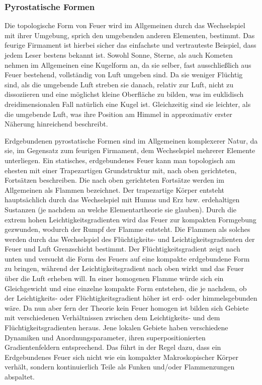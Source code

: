 \documentclass[a5paper,8pt]{book}
\begin{document}
\subsubsection{Pyrostatische Formen}

Die topologische Form von Feuer wird im Allgemeinen durch das Wechselspiel mit ihrer Umgebung, sprich den umgebenden anderen 
Elementen, bestimmt.
Das feurige Firmament ist hierbei sicher das einfachste und vertrauteste Beispiel, dass jedem Leser bestens bekannt ist. 
Sowohl Sonne, Sterne, als auch Kometen nehmen im Allgemeinen eine Kugelform an, da sie selber, fast ausschließlich aus 
Feuer bestehend, vollständig von Luft umgeben sind. Da sie weniger Flüchtig sind, als die umgebende Luft streben sie 
danach, relativ zur Luft, nicht zu dissoziieren und eine möglichst kleine Oberfläche zu bilden, was im euklidisch 
dreidimensionalen Fall natürlich eine Kugel ist.
Gleichzeitig sind sie leichter, als die umgebende Luft, was ihre Position am Himmel in approximativ erster Näherung 
hinreichend beschreibt.

Erdgebundenen pyrostatische Formen sind im Allgemeinen komplexerer Natur, da sie, im Gegensatz zum feurigen Firmament, 
dem Wechselspiel mehrerer Elemente unterliegen. Ein statisches, erdgebundenes Feuer kann man topologisch am ehesten mit 
einer Trapezartigen Grundstruktur mit, nach oben gerichteten, Fortsätzen beschreiben. Die nach oben gerichteten Fortsätze 
werden im Allgemeinen als Flammen bezeichnet.
Der trapezartige Körper entsteht hauptsächlich durch das Wechselspiel mit Humus und Erz bzw. erdehaltigen Sustanzen (je 
nachdem an welche Elementartheorie sie glauben). Durch die extrem hohen Leichtigkeitsgradienten wird das Feuer zur 
kompakten Formgebung gezwunden, wodurch der Rumpf der Flamme entsteht. Die Flammen als solches werden durch das 
Wechselspiel des Flüchtigkeits- und Leichtigkeitsgradienten der Feuer und Luft Grenzschicht bestimmt. Der 
Flüchtigkeitsgradient zeigt nach unten und versucht die Form des Feuers auf eine kompakte erdgebundene Form zu bringen, 
während der Leichtigkeitsgradient nach oben wirkt und das Feuer über die Luft erheben will. In einer homogenen Flamme 
würde sich ein Gleichgewicht und eine einzelne kompakte Form entstehen, die je nachdem, ob der Leichtigkeits- oder 
Flüchtigkeitsgradient höher ist erd- oder himmelsgebunden wäre.
Da nun aber fern der Theorie kein Feuer homogen ist bilden sich Gebiete mit verschiedenen Verhältnissen zwischen dem 
Leichtigkeits- und dem Flüchtigkeitsgradienten heraus. Jene lokalen Gebiete haben verschiedene Dynamiken und 
Anordnungsparameter, ihren superpositionierten Gradientenfeldern entsprechend.
Das führt in der Regel dazu, dass ein Erdgebundenes Feuer sich nicht wie ein kompakter Makroskopischer Körper verhält, 
sondern kontinuierlich Teile als Funken und/oder Flammenzungen abspaltet.
\end{document}
